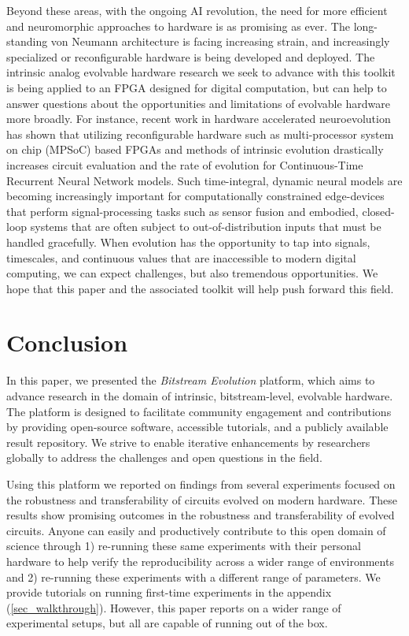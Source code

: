 \documentclass{ieeeaccess}
\begin{document}
Beyond these areas, with the ongoing AI revolution, the need for more efficient and neuromorphic approaches to hardware is as promising as ever. The long-standing von Neumann architecture is facing increasing strain, and increasingly specialized or reconfigurable hardware is being developed and deployed. The intrinsic analog evolvable hardware research we seek to advance with this toolkit is being applied to an FPGA designed for digital computation, but can help to answer questions about the opportunities and limitations of evolvable hardware more broadly. For instance, recent work in hardware accelerated neuroevolution \cite{Whitley2024NeuroevolvingNetworks} has shown that utilizing reconfigurable hardware such as multi-processor system on chip (MPSoC) based FPGAs and methods of intrinsic evolution drastically increases circuit evaluation and the rate of evolution for Continuous-Time Recurrent Neural Network models. Such time-integral, dynamic neural models are becoming increasingly important for computationally constrained edge-devices that perform signal-processing tasks such as sensor fusion and embodied, closed-loop systems that are often subject to out-of-distribution inputs that must be handled gracefully. When evolution has the opportunity to tap into signals, timescales, and continuous values that are inaccessible to modern digital computing, we can expect challenges, but also tremendous opportunities. We hope that this paper and the associated toolkit will help push forward this field.

\section{Conclusion}
In this paper, we presented the \textit{Bitstream Evolution} platform, which aims to advance research in the domain of intrinsic, bitstream-level, evolvable hardware. The platform is designed to facilitate community engagement and contributions by providing open-source software,  accessible tutorials, and a publicly available result repository. We strive to enable iterative enhancements by researchers globally to address the challenges and open questions in the field. 




Using this platform we reported on findings from several experiments focused on the robustness and transferability of circuits evolved on modern hardware. These results show promising outcomes in the robustness and transferability of evolved circuits. %
Anyone can easily and productively contribute to this open domain of science through 1) re-running these same experiments with their personal hardware to help verify the reproducibility across a wider range of environments and 2) re-running these experiments with a different range of parameters. We provide tutorials on running first-time experiments in the appendix (\ref{sec_walkthrough}). However, this paper reports on a wider range of experimental setups, but all are capable of running out of the box.
\end{document}

